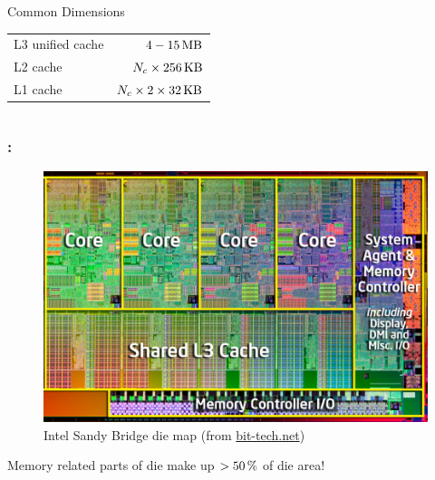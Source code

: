 \documentclass[9pt,xcolor=table]{beamer}
\begin{document}
\begin{frame}
\begin{columns}[c]
\begin{column}{.45\textwidth}
    \begin{block}{Common Dimensions}
      \begin{tabular}[h]{lr}
        L3 unified cache & $\unit[4-15]{MB}$ \\
        L2 cache & $N_{c}\times\unit[256]{KB}$ \\
        L1 cache & $N_{c}\times2\times\unit[32]{KB}$
      \end{tabular}
    \end{block}
    \vfill
  \end{column}
\end{columns}
\end{frame}

\begin{frame}
\frametitle{\insertsectionhead{}: \insertsubsection{}}
\begin{figure}[htb]
      \includegraphics[height=0.65\textheight]{img/sandy-bridge-die-map_noIGP}\\[2pt]\small
      Intel\textregistered{} Sandy Bridge \textregistered{} die map (from \href{http://www.bit-tech.net/hardware/cpus/2011/01/03/intel-sandy-bridge-review/1}{bit-tech.net})
    \end{figure}
    \begin{center}\large
      \alert{Memory related parts of die make up $>\unit[50]{\%}$ of
        die area!}
    \end{center}
\end{frame}
\end{document}
